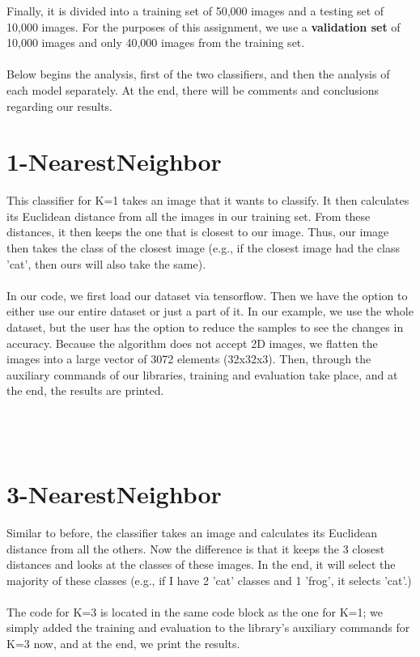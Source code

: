 \documentclass[11pt, letterpaper]{article}
\begin{document}
Finally, it is divided into a training set of 50,000 images and a testing set of 10,000 images. For the purposes of this assignment, we use a \textbf{validation set} of 10,000 images and only 40,000 images from the training set. \\  \\
Below begins the analysis, first of the two classifiers, and then the analysis of each model separately. At the end, there will be comments and conclusions regarding our results.

\newpage

\section*{1-NearestNeighbor}
This classifier for K=1 takes an image that it wants to classify. It then calculates its Euclidean distance from all the images in our training set. From these distances, it then keeps the one that is closest to our image. Thus, our image then takes the class of the closest image (e.g., if the closest image had the class 'cat', then ours will also take the same).\\ \\
In our code, we first load our dataset via tensorflow. Then we have the option to either use our entire dataset or just a part of it. In our example, we use the whole dataset, but the user has the option to reduce the samples to see the changes in accuracy. Because the algorithm does not accept 2D images, we flatten the images into a large vector of 3072 elements (32x32x3). Then, through the auxiliary commands of our libraries, training and evaluation take place, and at the end, the results are printed. \\ \\ \\ \\


\section*{3-NearestNeighbor}
Similar to before, the classifier takes an image and calculates its Euclidean distance from all the others. Now the difference is that it keeps the 3 closest distances and looks at the classes of these images. In the end, it will select the majority of these classes (e.g., if I have 2 'cat' classes and 1 'frog', it selects 'cat'.) \\ \\
The code for K=3 is located in the same code block as the one for K=1; we simply added the training and evaluation to the library's auxiliary commands for K=3 now, and at the end, we print the results. \\ \\ \\ \\ 
\end{document}
